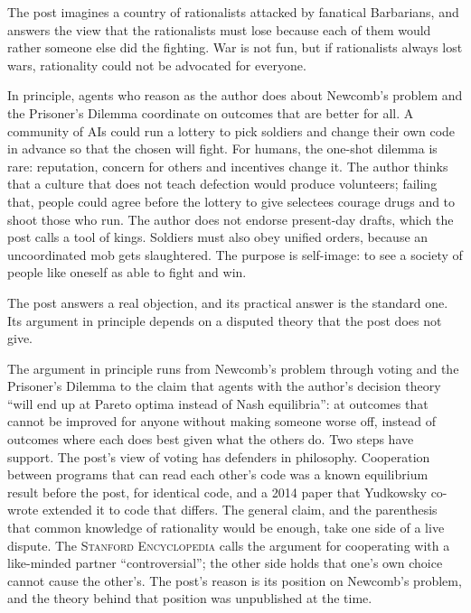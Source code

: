 \begin{afterword}
\summaryhead

The post imagines a country of rationalists attacked by fanatical Barbarians, and answers the view that the rationalists must lose because each of them would rather someone else did the fighting. War is not fun, but if rationalists always lost wars, rationality could not be advocated for everyone.

In principle, agents who reason as the author does about Newcomb's problem and the Prisoner's Dilemma coordinate on outcomes that are better for all. A community of AIs could run a lottery to pick soldiers and change their own code in advance so that the chosen will fight. For humans, the one-shot dilemma is rare: reputation, concern for others and incentives change it. The author thinks that a culture that does not teach defection would produce volunteers; failing that, people could agree before the lottery to give selectees courage drugs and to shoot those who run. The author does not endorse present-day drafts, which the post calls a tool of kings. Soldiers must also obey unified orders, because an uncoordinated mob gets slaughtered. The purpose is self-image: to see a society of people like oneself as able to fight and win.

\responsehead

The post answers a real objection, and its practical answer is the standard one. Its argument in principle depends on a disputed theory that the post does not give.

The argument in principle runs from Newcomb's problem through voting and the Prisoner's Dilemma to the claim that agents with the author's decision theory ``will end up at Pareto optima instead of Nash equilibria'': at outcomes that cannot be improved for anyone without making someone worse off, instead of outcomes where each does best given what the others do. Two steps have support. The post's view of voting has defenders in philosophy. Cooperation between programs that can read each other's code was a known equilibrium result before the post, for identical code, and a 2014 paper that Yudkowsky co-wrote extended it to code that differs. The general claim, and the parenthesis that common knowledge of rationality would be enough, take one side of a live dispute. The \textsc{Stanford Encyclopedia} calls the argument for cooperating with a like-minded partner ``controversial''; the other side holds that one's own choice cannot cause the other's. The post's reason is its position on Newcomb's problem, and the theory behind that position was unpublished at the time.


\end{afterword}
